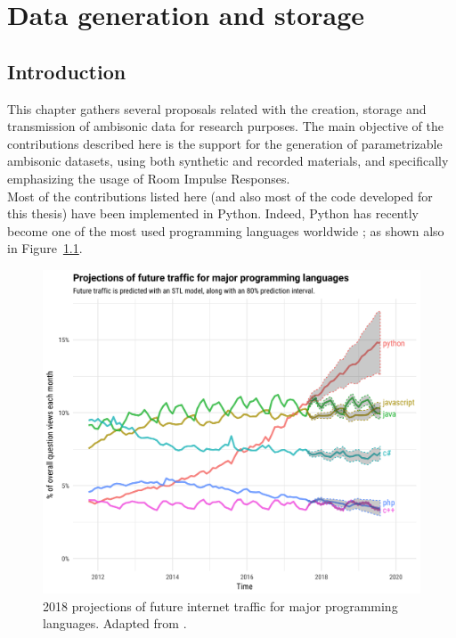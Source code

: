 \chapter{Data generation and storage}
\label{chap:data}

\section{Introduction}
\label{sec:intro_data}

This chapter gathers several proposals related with the creation, storage and transmission of ambisonic data for research purposes. The main objective of the contributions described here is the support for the generation of parametrizable ambisonic datasets, using both synthetic and recorded materials, and specifically emphasizing the usage of Room Impulse Responses.\\ 

Most of the contributions listed here (and also most of the code developed for this thesis) have been implemented in Python. Indeed, Python has recently become one of the most used programming languages worldwide \cite{theoverflow, PYPL, TIOBE}; as shown also in Figure~\ref{fig:popularity}.\\

\begin{figure}
  \centering
    \includegraphics[width=\textwidth]{Figures/DataGeneration/projections-1-1400x1200.png}
    \caption{2018 projections of future internet traffic for major programming languages. Adapted from \cite{theoverflow}.}
    \label{fig:popularity}
\end{figure}


